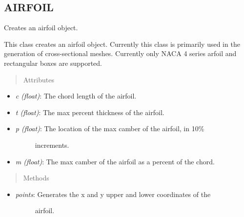 \documentclass[letterpaper,10pt,english]{sphinxmanual}
\begin{document}
\subsection{AIRFOIL}
\label{aerodynamics:airfoil}

\begin{fulllineitems}
\label{aerodynamics:AeroComBAT.Aerodynamics.Airfoil}
Creates an airfoil object.

This class creates an airfoil object. Currently this class is primarily
used in the generation of cross-sectional meshes. Currently only NACA 4
series arfoil and rectangular boxes are supported.
\begin{quote}\begin{description}
\item[{Attributes}] \leavevmode
\end{description}\end{quote}
\begin{itemize}
\item {} 
\emph{c (float)}: The chord length of the airfoil.

\item {} 
\emph{t (float)}: The max percent thickness of the airfoil.

\item {} \begin{description}
\item[{\emph{p (float)}: The location of the max camber of the airfoil, in 10\%}] \leavevmode
increments.

\end{description}

\item {} 
\emph{m (float)}: The max camber of the airfoil as a percent of the chord.

\end{itemize}
\begin{quote}\begin{description}
\item[{Methods}] \leavevmode
\end{description}\end{quote}
\begin{itemize}
\item {} \begin{description}
\item[{\emph{points}: Generates the x and y upper and lower coordinates of the}] \leavevmode
airfoil.


\end{description}
\end{itemize}
\end{fulllineitems}
\end{document}
